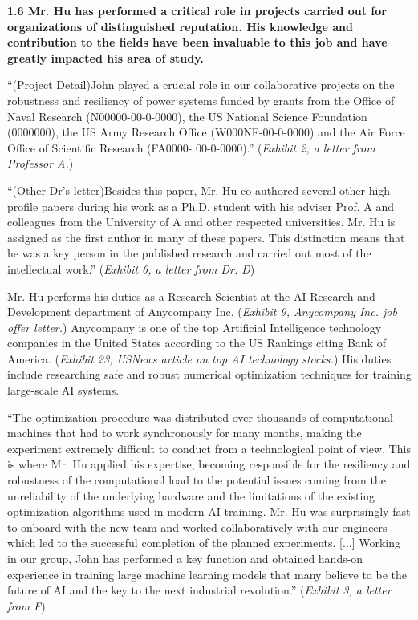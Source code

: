 \documentclass{article}
\begin{document}
{\bf 1.6 Mr. Hu has performed a critical role in projects carried out for organizations of distinguished reputation. His knowledge and contribution to the fields have been invaluable to this job and have greatly impacted his area of study. }

“(Project Detail)John played a crucial role in our collaborative projects on the robustness and resiliency of power systems funded by grants from the Office of Naval Research (N00000-00-0-0000), the US National Science Foundation (0000000), the US Army Research Office (W000NF-00-0-0000) and the Air Force Office of Scientific Research (FA0000- 00-0-0000).” ({\it Exhibit 2, a letter from Professor A.}) 

“(Other Dr's letter)Besides this paper, Mr. Hu co-authored several other high-profile papers during his work as a Ph.D. student with his adviser Prof. A and colleagues from the University of A and other respected universities. Mr. Hu is assigned as the first author in many of these papers. This distinction means that he was a key person in the published research and carried out most of the intellectual work.” ({\it Exhibit 6, a letter from Dr. D}) 

Mr. Hu performs his duties as a Research Scientist at the AI Research and Development department of Anycompany Inc. ({\it Exhibit 9, Anycompany Inc. job offer letter.}) Anycompany is one of the top Artificial Intelligence technology companies in the United States according to the US Rankings citing Bank of America. ({\it Exhibit 23, USNews article on top AI technology stocks.}) His duties include researching safe and robust numerical optimization techniques for training large-scale AI systems.

“The optimization procedure was distributed over thousands of computational machines that had to work synchronously for many months, making the experiment extremely difficult to conduct from a technological point of view. This is where Mr. Hu applied his expertise, becoming responsible for the resiliency and robustness of the computational load to the potential issues coming from the unreliability of the underlying hardware and the limitations of the existing optimization algorithms used in modern AI training. Mr. Hu was surprisingly fast to onboard with the new team and worked collaboratively with our engineers which led to the successful completion of the planned experiments. [...] Working in our group, John has performed a key function and obtained hands-on experience in training large machine learning models that many believe to be the future of AI and the key to the next industrial revolution.” ({\it Exhibit 3, a letter from F}) 
\end{document}
